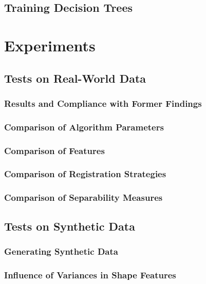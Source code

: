 \documentclass[pdftex,12pt,a4paper]{report}
\begin{document}
\section{Training Decision Trees}

\chapter{Experiments}

\section{Tests on Real-World Data}

\subsection{Results and Compliance with Former Findings}

\subsection{Comparison of Algorithm Parameters}

\subsection{Comparison of Features}

\subsection{Comparison of Registration Strategies}

\subsection{Comparison of Separability Measures}

\section{Tests on Synthetic Data}

\subsection{Generating Synthetic Data}

\subsection{Influence of Variances in Shape Features}
\end{document}
